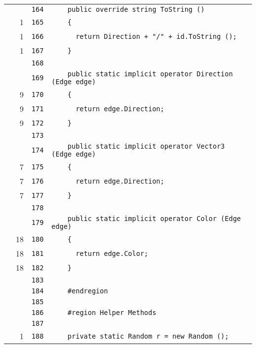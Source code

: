 \documentclass[a4paper,10pt]{article}
\begin{document}
\begin{longtable}[l]{lrrl}
\cellcolor{gray} &  & \verb~164~ & \verb~    public override string ToString ()~\\
\cellcolor{green} & 1 & \verb~165~ & \verb~    {~\\
\cellcolor{green} & 1 & \verb~166~ & \verb~      return Direction + "/" + id.ToString ();~\\
\cellcolor{green} & 1 & \verb~167~ & \verb~    }~\\
\cellcolor{gray} &  & \verb~168~ & \verb~~\\
\cellcolor{gray} &  & \verb~169~ & \verb~    public static implicit operator Direction (Edge edge)~\\
\cellcolor{green} & 9 & \verb~170~ & \verb~    {~\\
\cellcolor{green} & 9 & \verb~171~ & \verb~      return edge.Direction;~\\
\cellcolor{green} & 9 & \verb~172~ & \verb~    }~\\
\cellcolor{gray} &  & \verb~173~ & \verb~~\\
\cellcolor{gray} &  & \verb~174~ & \verb~    public static implicit operator Vector3 (Edge edge)~\\
\cellcolor{green} & 7 & \verb~175~ & \verb~    {~\\
\cellcolor{green} & 7 & \verb~176~ & \verb~      return edge.Direction;~\\
\cellcolor{green} & 7 & \verb~177~ & \verb~    }~\\
\cellcolor{gray} &  & \verb~178~ & \verb~~\\
\cellcolor{gray} &  & \verb~179~ & \verb~    public static implicit operator Color (Edge edge)~\\
\cellcolor{green} & 18 & \verb~180~ & \verb~    {~\\
\cellcolor{green} & 18 & \verb~181~ & \verb~      return edge.Color;~\\
\cellcolor{green} & 18 & \verb~182~ & \verb~    }~\\
\cellcolor{gray} &  & \verb~183~ & \verb~~\\
\cellcolor{gray} &  & \verb~184~ & \verb~    #endregion~\\
\cellcolor{gray} &  & \verb~185~ & \verb~~\\
\cellcolor{gray} &  & \verb~186~ & \verb~    #region Helper Methods~\\
\cellcolor{gray} &  & \verb~187~ & \verb~~\\
\cellcolor{green} & 1 & \verb~188~ & \verb~    private static Random r = new Random ();~\\

\end{longtable}
\end{document}
